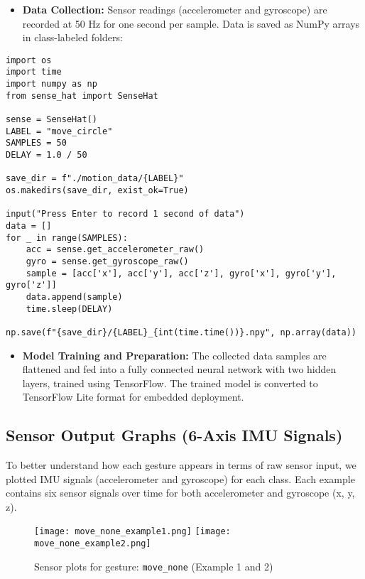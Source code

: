 \documentclass[a4paper,12pt]{article}
\begin{document}
\begin{itemize}
    \item \textbf{Data Collection:} Sensor readings (accelerometer and gyroscope) are recorded at 50 Hz for one second per sample. Data is saved as NumPy arrays in class-labeled folders:
\end{itemize}

\begin{lstlisting}
import os
import time
import numpy as np
from sense_hat import SenseHat

sense = SenseHat()
LABEL = "move_circle"
SAMPLES = 50
DELAY = 1.0 / 50

save_dir = f"./motion_data/{LABEL}"
os.makedirs(save_dir, exist_ok=True)

input("Press Enter to record 1 second of data")
data = []
for _ in range(SAMPLES):
    acc = sense.get_accelerometer_raw()
    gyro = sense.get_gyroscope_raw()
    sample = [acc['x'], acc['y'], acc['z'], gyro['x'], gyro['y'], gyro['z']]
    data.append(sample)
    time.sleep(DELAY)

np.save(f"{save_dir}/{LABEL}_{int(time.time())}.npy", np.array(data))
\end{lstlisting}

\begin{itemize}
    \item \textbf{Model Training and Preparation:} The collected data samples are flattened and fed into a fully connected neural network with two hidden layers, trained using TensorFlow. The trained model is converted to TensorFlow Lite format for embedded deployment.
\end{itemize}

\subsection*{Sensor Output Graphs (6-Axis IMU Signals)}

To better understand how each gesture appears in terms of raw sensor input, we plotted IMU signals (accelerometer and gyroscope) for each class. Each example contains six sensor signals over time for both accelerometer and gyroscope (x, y, z).

\begin{figure}[h!]
\centering
\texttt{[image: move\_none\_example1.png]}
\hfill
\texttt{[image: move\_none\_example2.png]}
\caption{Sensor plots for gesture: \texttt{move\_none} (Example 1 and 2)}
\end{figure}
\end{document}
